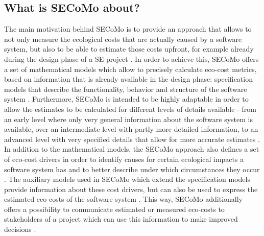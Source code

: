 \documentclass[oribibl]{llncs}
\begin{document}
\subsection{What is SECoMo about?} %
The main motivation behind SECoMo is to provide an approach that allows to not only measure the ecological costs that are actually caused by a software system, but also to be able to estimate those costs upfront, for example already during the design phase of a SE project \cite{schulze_cost_2016}. %
In order to achieve this, SECoMo offers a set of mathematical models which allow to precisely calculate eco-cost metrics, based on information that is already available in the design phase: specification models %
that describe the functionality, behavior and structure of the software system \cite{schulze_cost_2016}. Furthermore, SECoMo is intended to be highly adaptable %
in order to allow the estimates to be calculated for different levels of details available - from an early level where only very general information about the software system is available, over an intermediate level with partly more detailed information, to an advanced level with very specified details that allow for more accurate estimates \cite{schulze_cost_2016}.\\ %
In addition to the mathematical models, the SECoMo approach also defines a set of eco-cost drivers in order to identify causes for certain ecological impacts a software system has and to better describe under which circumstances they occur \cite{schulze_cost_2016}. The auxiliary models used in SECoMo which extend the specification models %
provide information about these cost drivers, but can also be used to express the estimated eco-costs of the software system \cite{schulze_cost_2016}. This way, SECoMo additionally offers a possibility to communicate estimated or measured eco-costs to stakeholders of a project which can use this information to make improved decisions \cite{schulze_cost_2016}.\\ %
\end{document}
